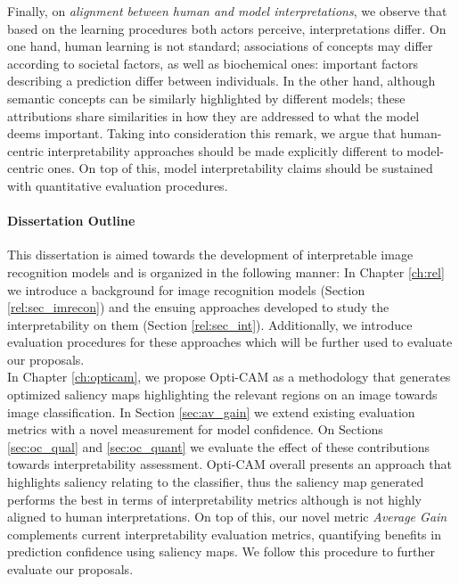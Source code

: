 \noindent Finally, on \emph{alignment between human and model interpretations}, we observe that 
based on the learning procedures both actors perceive, interpretations differ. On one hand, human 
learning is not standard; associations of concepts may differ according to societal factors, as well 
as biochemical ones: important factors describing a prediction differ between individuals. In the 
other hand, although semantic concepts can be similarly highlighted by different models; these 
attributions share similarities in how they  are addressed to what the model deems important. 
Taking into consideration this remark, we argue that human-centric interpretability approaches 
should be made explicitly different to model-centric ones. On top of this, model 
interpretability claims should be sustained with quantitative evaluation procedures.

\paragraph{Dissertation Outline}
\noindent This dissertation is aimed towards the development of interpretable image recognition 
models and is organized in the following manner: In Chapter \ref{ch:rel} we 
introduce a background for image recognition models (Section \ref{rel:sec_imrecon}) and the ensuing 
approaches developed to study the interpretability on them (Section \ref{rel:sec_int}). 
Additionally, we introduce evaluation procedures for these approaches which will be further used to 
evaluate our proposals.\\

\noindent In Chapter \ref{ch:opticam}, we propose Opti-CAM as a methodology that generates 
optimized saliency maps highlighting the relevant regions on an image towards image classification. 
In Section \ref{sec:av_gain} we extend existing evaluation metrics with a novel measurement for 
model confidence. On Sections \ref{sec:oc_qual} and \ref{sec:oc_quant} we evaluate the effect of 
these contributions towards interpretability assessment. Opti-CAM overall presents an approach that 
highlights saliency relating to the classifier, thus the saliency map generated performs the best 
in terms of interpretability metrics although is not highly aligned to human interpretations. 
On top of this, our novel metric \emph{Average Gain} complements current interpretability evaluation 
metrics, quantifying benefits in prediction confidence using saliency maps. We follow this 
procedure to further evaluate our proposals.\\


